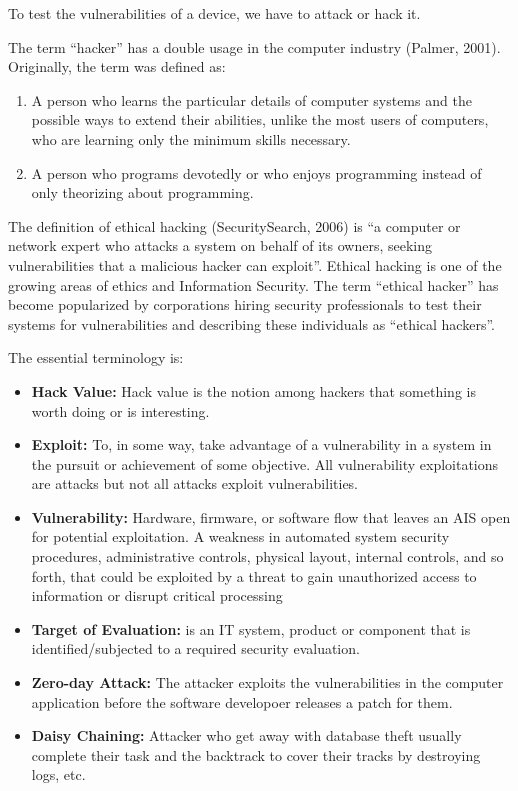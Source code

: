 
To test the vulnerabilities of a device, we have to attack or hack it.

The term ``hacker'' has a double usage in the computer industry (Palmer, 2001). Originally, the term was defined as:  
\begin{enumerate}
	\item A person who learns the particular details of computer systems and the possible ways to extend their abilities, unlike  the  most  users  of  computers,  who  are  learning  only the minimum skills necessary.  
	\item A person who programs devotedly or who enjoys programming instead of only theorizing about programming.
\end{enumerate}

The definition of ethical hacking (SecuritySearch, 2006) is  ``a computer or network expert who attacks a system on behalf of its owners, seeking vulnerabilities that a malicious hacker can exploit''. Ethical hacking is one of the growing areas of ethics and Information Security. The term ``ethical hacker'' has become popularized by corporations hiring security professionals to test their systems for vulnerabilities and describing these individuals as ``ethical hackers''.\cite{ethicalHacking}

The essential terminology is:
\begin{itemize}
	\item \textbf{Hack Value:} Hack value is the notion among hackers that something is worth doing or is interesting.
	\item \textbf{Exploit:} To, in some way, take advantage of a vulnerability in a system in the pursuit or achievement of some objective. All vulnerability exploitations are attacks but not all attacks exploit vulnerabilities.\cite{Hacking1}
	\item \textbf{Vulnerability:} Hardware, firmware, or software flow that leaves an AIS open for potential exploitation. A weakness in automated system security procedures, administrative controls, physical layout, internal controls, and so forth, that could be exploited by a threat to gain unauthorized access to information or disrupt critical processing
	\item \textbf{Target of Evaluation:} is an IT system, product or component that is identified/subjected to a required security evaluation.
	\item \textbf{Zero-day Attack:} The attacker exploits the vulnerabilities in the computer application before the software developoer releases a patch for them.
	\item \textbf{Daisy Chaining:} Attacker who get away with database theft usually complete their task and the backtrack to cover their tracks by destroying logs, etc.
\end{itemize}

